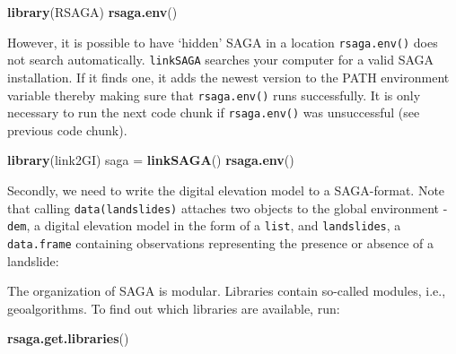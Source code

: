 \documentclass[]{krantz}
\newenvironment{Shaded}{\begin{snugshade}}{\end{snugshade}}
\newcommand{\DataTypeTok}[1]{\textcolor[rgb]{0.27,0.27,0.27}{#1}}
\newcommand{\KeywordTok}[1]{\textcolor[rgb]{0.27,0.27,0.27}{\textbf{#1}}}
\newcommand{\NormalTok}[1]{#1}
\newcommand{\OperatorTok}[1]{\textcolor[rgb]{0.43,0.43,0.43}{\textbf{#1}}}
\newcommand{\StringTok}[1]{\textcolor[rgb]{0.5,0.5,0.5}{#1}}
\begin{document}
\begin{Shaded}
\begin{Highlighting}[]
\KeywordTok{library}\NormalTok{(RSAGA)}
\KeywordTok{rsaga.env}\NormalTok{()}
\end{Highlighting}
\end{Shaded}

However, it is possible to have `hidden' SAGA in a location \texttt{rsaga.env()} does not search automatically.
\texttt{linkSAGA} searches your computer for a valid SAGA installation.
If it finds one, it adds the newest version to the PATH environment variable thereby making sure that \texttt{rsaga.env()} runs successfully.
It is only necessary to run the next code chunk if \texttt{rsaga.env()} was unsuccessful (see previous code chunk).

\begin{Shaded}
\begin{Highlighting}[]
\KeywordTok{library}\NormalTok{(link2GI)}
\NormalTok{saga =}\StringTok{ }\KeywordTok{linkSAGA}\NormalTok{()}
\KeywordTok{rsaga.env}\NormalTok{()}
\end{Highlighting}
\end{Shaded}

Secondly, we need to write the digital elevation model to a SAGA-format.
Note that calling \texttt{data(landslides)} attaches two objects to the global environment - \texttt{dem}, a digital elevation model in the form of a \texttt{list}, and \texttt{landslides}, a \texttt{data.frame} containing observations representing the presence or absence of a landslide:

\begin{Shaded}
\end{Shaded}

The organization of SAGA is modular.
Libraries contain so-called modules, i.e., geoalgorithms.
To find out which libraries are available, run:

\begin{Shaded}
\begin{Highlighting}[]
\KeywordTok{rsaga.get.libraries}\NormalTok{()}
\end{Highlighting}
\end{Shaded}
\end{document}
